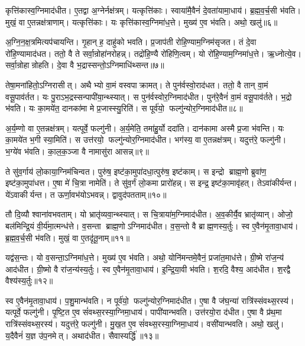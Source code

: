 कृत्ति॑कास्व॒ग्निमाद॑धीत। ए॒तद्वा अ॒ग्नेर्नक्ष॑त्रम्। यत्कृत्ति॑काः। स्वाया॑मै॒वैनं॑ दे॒वता॑यामा॒धाय॑। ब्र॒ह्म॒व॒र्च॒सी भ॑वति। मुखं॒ वा ए॒तन्नक्ष॑त्राणाम्। यत्कृत्ति॑काः। यः कृत्ति॑कास्व॒ग्निमा॑ध॒त्ते। मुख्य॑ ए॒व भ॑वति। अथो॒ खलु॑॥६॥

अ॒ग्नि॒न॒क्ष॒त्रमित्यप॑चायन्ति। गृ॒हान् ह॒ दाहु॑को भवति। प्र॒जाप॑ती रोहि॒ण्याम॒ग्निम॑सृजत। तं दे॒वा रो॑हि॒ण्यामाद॑धत। ततो॒ वै ते सर्वा॒न्रोहा॑नरोहन्न्। तद्रो॑हि॒ण्यै रो॑हिणि॒त्वम्। यो रो॑हि॒ण्याम॒ग्निमा॑ध॒त्ते। ऋ॒ध्नोत्ये॒व। सर्वा॒न्रोहान्रोहति। दे॒वा वै भ॒द्रास्सन्तो॒ऽग्निमाधि॑थ्सन्त॥७॥

तेषा॒मना॑हितो॒ऽग्निरासीत्। अथैभ्यो वा॒मं वस्वपाक्रामत्। ते पुन॑र्वस्वो॒राद॑धत। ततो॒ वै तान् वा॒मं वसू॒पाव॑र्तत। यः पु॒राऽभ॒द्रस्सन्पापी॑या॒न्थ्स्यात्। स पुन॑र्वस्वोर॒ग्निमाद॑धीत। पुन॑रे॒वैनं॑ वा॒मं वसू॒पाव॑र्तते। भ॒द्रो भ॑वति। यः का॒मये॑त॒ दानका॑मा मे प्र॒जास्स्यु॒रिति॑। स पूर्व॑यो॒ फल्गु॑न्योर॒ग्निमाद॑धीत॥८॥

अ॒र्य॒म्णो वा ए॒तन्नक्ष॑त्रम्। यत्पूर्वे॒ फल्गु॑नी। अ॒र्य॒मेति॒ तमा॑हु॒र्यो ददा॑ति। दान॑कामा अस्मै प्र॒जा भ॑वन्ति। यः का॒मये॑त भ॒गी स्या॒मिति॑। स उत्त॑रयो॒ फल्गु॑न्योर॒ग्निमाद॑धीत। भग॑स्य॒ वा ए॒तन्नक्ष॑त्रम्। यदुत्त॑रे॒ फल्गु॑नी। भ॒ग्ये॑व भ॑वति। का॒ल॒क॒ञ्जा वै नामासु॑रा आसन्न्॥९॥

ते सु॑व॒र्गाय॑ लो॒काया॒ग्निम॑चिन्वत। पुरु॑ष॒ इष्ट॑का॒मुपा॑दधा॒त्पुरु॑ष॒ इष्ट॑काम्। स इन्द्रो ब्राह्म॒णो ब्रुवा॑ण॒ इष्ट॑का॒मुपा॑धत्त। ए॒षा मे॑ चि॒त्रा नामेति॑। ते सु॑व॒र्गं लो॒कमा प्रारो॑हन्न्। स इन्द्र॒ इष्ट॑का॒मावृ॑हत्। तेऽवा॑कीर्यन्त। ये॑ऽवाकीर्यन्त। त ऊर्णा॒वभ॑योऽभवन्न्। द्वावुद॑पतताम्॥१०॥

तौ दि॒व्यौ श्वाना॑वभवताम्। यो भ्रातृ॑व्यवा॒न्थ्स्यात्। स चि॒त्राया॑म॒ग्निमाद॑धीत। अ॒व॒कीर्यै॒व भ्रातृ॑व्यान्। ओजो॒ बल॑मिन्द्रि॒यं वी॒र्य॑मा॒त्मन्ध॑त्ते। व॒सन्ता ब्राह्म॒णोऽग्निमाद॑धीत। व॒स॒न्तो वै ब्राह्म॒णस्य॒र्तुः। स्व ए॒वैन॑मृ॒तावा॒धाय॑। ब्र॒ह्म॒व॒र्च॒सी भ॑वति। मुखं॒ वा ए॒तदृ॑तू॒नाम्॥११॥

यद्व॑स॒न्तः। यो व॒सन्ता॒ऽग्निमा॑ध॒त्ते। मुख्य॑ ए॒व भ॑वति। अथो॒ योनि॑मन्तमे॒वैनं॒ प्रजा॑त॒माध॑त्ते। ग्री॒ष्मे रा॑ज॒न्य॑ आद॑धीत। ग्री॒ष्मो वै रा॑ज॒न्य॑स्य॒र्तुः। स्व ए॒वैन॑मृ॒तावा॒धाय॑। इ॒न्द्रि॒या॒वी भ॑वति। श॒रदि॒ वैश्य॒ आद॑धीत। श॒रद्वै वैश्य॑स्य॒र्तुः॥१२॥

स्व ए॒वैन॑मृ॒तावा॒धाय॑। प॒शु॒मान्भ॑वति। न पूर्व॑यो॒ फल्गु॑न्योर॒ग्निमाद॑धीत। ए॒षा वै ज॑घ॒न्या॑ रात्रि॑स्संवथ्स॒रस्य॑। यत्पूर्वे॒ फल्गु॑नी। पृ॒ष्टि॒त ए॒व सं॑वथ्स॒रस्या॒ग्निमा॒धाय॑। पापी॑यान्भवति। उत्त॑रयो॒रा द॑धीत। ए॒षा वै प्र॑थ॒मा रात्रि॑स्संवथ्स॒रस्य॑। यदुत्त॑रे॒ फल्गु॑नी। मु॒ख॒त ए॒व सं॑वथ्स॒रस्या॒ग्निमा॒धाय॑। वसी॑यान्भवति। अथो॒ खलु॑। य॒दैवैनं॑ य॒ज्ञ उ॑प॒नमेत्। अथाद॑धीत। सैवास्यर्द्धि॑॥१३॥
\anuvakamend[खल्वा॑धिथ्सन्त॒ फल्गु॑न्योर॒ग्निमाद॑धीतासन्नपततामृतू॒नां वैश्य॑स्य॒र्तुरुत्त॑रे॒ फल्गु॑नी॒ षट्च॑]

